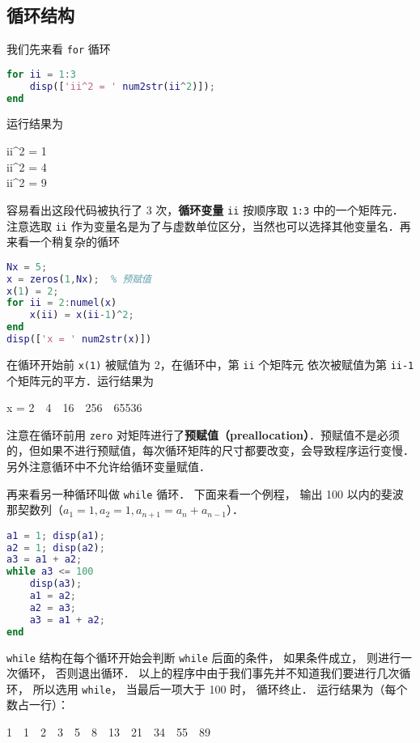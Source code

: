 \subsection{循环结构}
我们先来看 \texttt{for} 循环
\begin{lstlisting}[language=Matlab]
for ii = 1:3
    disp(['ii^2 = ' num2str(ii^2)]);
end
\end{lstlisting}
运行结果为
\begin{Command}
ii\^{}2 = 1 \\
ii\^{}2 = 4 \\
ii\^{}2 = 9 
\end{Command}
容易看出这段代码被执行了 3 次，\textbf{循环变量} \texttt{ii} 按顺序取 \texttt{1:3} 中的一个矩阵元．注意选取 \texttt{ii} 作为变量名是为了与虚数单位区分，当然也可以选择其他变量名．再来看一个稍复杂的循环
\begin{lstlisting}[language=Matlab]
Nx = 5;
x = zeros(1,Nx);  % 预赋值
x(1) = 2;
for ii = 2:numel(x)
    x(ii) = x(ii-1)^2;
end
disp(['x = ' num2str(x)])
\end{lstlisting}
在循环开始前 \texttt{x(1)} 被赋值为 2，在循环中，第 \texttt{ii} 个矩阵元 依次被赋值为第 \texttt{ii-1} 个矩阵元的平方．运行结果为
\begin{Command}
x = 2\ \ 4\ \ 16\ \ 256\ \ 65536
\end{Command}
注意在循环前用 \texttt{zero} 对矩阵进行了\textbf{预赋值（preallocation）}．预赋值不是必须的，但如果不进行预赋值，每次循环矩阵的尺寸都要改变，会导致程序运行变慢．另外注意循环中不允许给循环变量赋值．

再来看另一种循环叫做 \texttt{while} 循环． 下面来看一个例程， 输出 100 以内的斐波那契数列（$a_1 = 1, a_2 = 1, a_{n+1} = a_{n} + a_{n-1}$）．
\begin{lstlisting}[language=Matlab]
a1 = 1; disp(a1); 
a2 = 1; disp(a2);
a3 = a1 + a2;
while a3 <= 100
    disp(a3);
    a1 = a2;
    a2 = a3;
    a3 = a1 + a2;
end
\end{lstlisting}
\texttt{while} 结构在每个循环开始会判断 \texttt{while} 后面的条件， 如果条件成立， 则进行一次循环， 否则退出循环． 以上的程序中由于我们事先并不知道我们要进行几次循环， 所以选用 \texttt{while}， 当最后一项大于 100 时， 循环终止． 运行结果为（每个数占一行）：
\begin{Command}
1\ \ 1\ \ 2\ \ 3\ \ 5\ \ 8\ \ 13\ \ 21\ \ 34\ \ 55\ \ 89
\end{Command}

